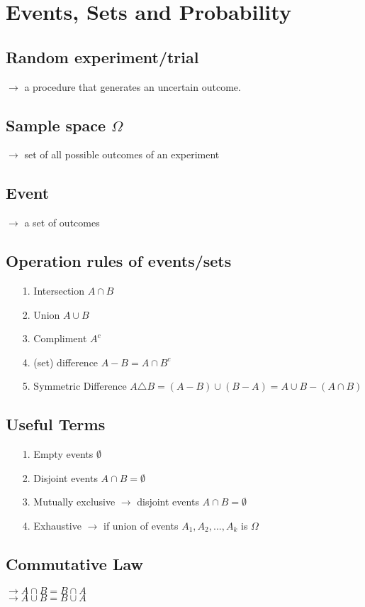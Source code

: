 \documentclass{article}
\begin{document}
\section{Events, Sets and Probability}
\subsection{Random experiment/trial}
$\rightarrow$ a procedure that generates an uncertain outcome.\\
\subsection{Sample space $\Omega$}
$\rightarrow$ set of all possible outcomes of an experiment \\
\subsection{Event}
$\rightarrow$ a set of outcomes \\
\subsection{Operation rules of events/sets}
\begin{itemize}
\item[1.] Intersection $A \cap B$
\item[2.] Union $A\cup B$
\item[3.] Compliment $A^c$
\item[4.] (set) difference $A-B = A \cap B^c$
\item[5.] Symmetric Difference $A \triangle B = (A-B) \cup (B-A) = A \cup B - (A \cap B)$
\end{itemize}
\subsection{Useful Terms}
\begin{itemize}
\item[1.] Empty events $\emptyset$
\item[2.] Disjoint events $A \cap B = \emptyset$
\item[3.] Mutually exclusive $\rightarrow$ disjoint events $A \cap B = \emptyset$
\item[4.] Exhaustive $\rightarrow$ if union of events $A_1, A_2, ..., A_k$ is $\Omega$
\end{itemize}
\subsection{Commutative Law}
$\rightarrow A \cap B = B \cap A$\\
$\rightarrow A \cup B = B \cup A$
\end{document}
